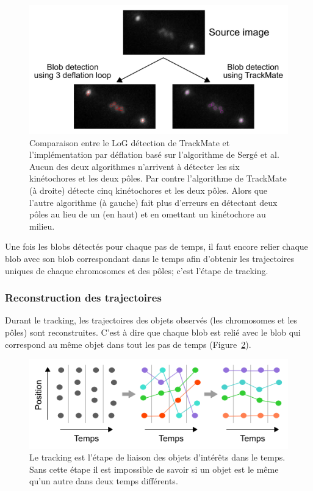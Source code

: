 \documentclass[12pt,a4paper,twoside,openright]{book}
\begin{document}
\begin{figure}[htbp]
\centering
\includegraphics{figures/results/imaging/compare.png}
\caption[Principe de l'algorithme de détection de blob par déflation]{\label{fig:compare}Comparaison
entre le LoG détection de TrackMate et l'implémentation par déflation
basé sur l'algorithme de Sergé et al. Aucun des deux algorithmes
n'arrivent à détecter les six kinétochores et les deux pôles. Par contre
l'algorithme de TrackMate (à droite) détecte cinq kinétochores et les
deux pôles. Alors que l'autre algorithme (à gauche) fait plus d'erreurs
en détectant deux pôles au lieu de un (en haut) et en omettant un
kinétochore au milieu.}
\end{figure}

Une fois les blobs détectés pour chaque pas de temps, il faut encore
relier chaque blob avec son blob correspondant dans le temps afin
d'obtenir les trajectoires uniques de chaque chromosomes et des pôles;
c'est l'étape de tracking.

\subsubsection{Reconstruction des
trajectoires}\label{reconstruction-des-trajectoires}

Durant le tracking, les trajectoires des objets observés (les
chromosomes et les pôles) sont reconstruites. C'est à dire que chaque
blob est relié avec le blob qui correspond au même objet dans tout les
pas de temps (Figure~\ref{fig:whatistracking}).

\begin{figure}[htbp]
\centering
\includegraphics{figures/results/imaging/whatistracking.png}
\caption[Le tracking est l'étape de liaison des objets d'intérêts dans le temps]{\label{fig:whatistracking}Le
tracking est l'étape de liaison des objets d'intérêts dans le temps.
Sans cette étape il est impossible de savoir si un objet est le même
qu'un autre dans deux temps différents.}
\end{figure}
\end{document}

